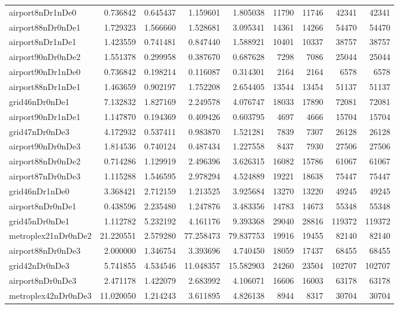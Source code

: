 \begin{longtable}{|l|r|r|r|r|r|r|r|r|}
airport8nDr1nDe0 & 0.736842 & 0.645437 & 1.159601 & 1.805038 & 11790 & 11746 & 42341 & 42341 \\
airport88nDr0nDe1 & 1.729323 & 1.566660 & 1.528681 & 3.095341 & 14361 & 14266 & 54470 & 54470 \\
airport8nDr1nDe1 & 1.423559 & 0.741481 & 0.847440 & 1.588921 & 10401 & 10337 & 38757 & 38757 \\
airport90nDr0nDe2 & 1.551378 & 0.299958 & 0.387670 & 0.687628 & 7298 & 7086 & 25044 & 25044 \\
airport90nDr1nDe0 & 0.736842 & 0.198214 & 0.116087 & 0.314301 & 2164 & 2164 & 6578 & 6578 \\
airport88nDr1nDe1 & 1.463659 & 0.902197 & 1.752208 & 2.654405 & 13544 & 13454 & 51137 & 51137 \\
grid46nDr0nDe1 & 7.132832 & 1.827169 & 2.249578 & 4.076747 & 18033 & 17890 & 72081 & 72081 \\
airport90nDr1nDe1 & 1.147870 & 0.194369 & 0.409426 & 0.603795 & 4697 & 4666 & 15704 & 15704 \\
grid47nDr0nDe3 & 4.172932 & 0.537411 & 0.983870 & 1.521281 & 7839 & 7307 & 26128 & 26128 \\
airport90nDr0nDe3 & 1.814536 & 0.740124 & 0.487434 & 1.227558 & 8437 & 7930 & 27506 & 27506 \\
airport88nDr0nDe2 & 0.714286 & 1.129919 & 2.496396 & 3.626315 & 16082 & 15786 & 61067 & 61067 \\
airport87nDr0nDe3 & 1.115288 & 1.546595 & 2.978294 & 4.524889 & 19221 & 18638 & 75447 & 75447 \\
grid46nDr1nDe0 & 3.368421 & 2.712159 & 1.213525 & 3.925684 & 13270 & 13220 & 49245 & 49245 \\
airport8nDr0nDe1 & 0.438596 & 2.235480 & 1.247876 & 3.483356 & 14783 & 14673 & 55348 & 55348 \\
grid45nDr0nDe1 & 1.112782 & 5.232192 & 4.161176 & 9.393368 & 29040 & 28816 & 119372 & 119372 \\
metroplex21nDr0nDe2 & 21.220551 & 2.579280 & 77.258473 & 79.837753 & 19916 & 19455 & 82140 & 82140 \\
airport88nDr0nDe3 & 2.000000 & 1.346754 & 3.393696 & 4.740450 & 18059 & 17437 & 68455 & 68455 \\
grid42nDr0nDe3 & 5.741855 & 4.534546 & 11.048357 & 15.582903 & 24260 & 23504 & 102707 & 102707 \\
airport8nDr0nDe3 & 2.471178 & 1.422079 & 2.683992 & 4.106071 & 16606 & 16003 & 63178 & 63178 \\
metroplex42nDr0nDe3 & 11.020050 & 1.214243 & 3.611895 & 4.826138 & 8944 & 8317 & 30704 & 30704 \\

\end{longtable}
